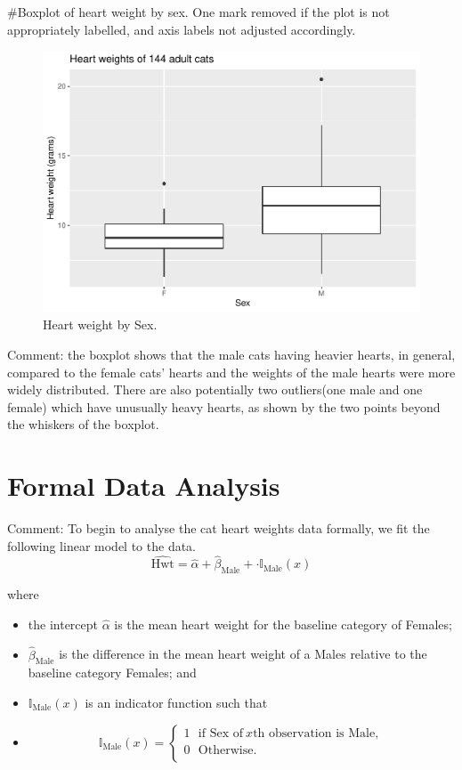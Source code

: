 \documentclass[
]{article}
\begin{document}
\#Boxplot of heart weight by sex. One mark removed if the plot is not
appropriately labelled, and axis labels not adjusted accordingly.

\begin{figure}[H]

{\centering \includegraphics[width=0.68\linewidth]{2561551_PracticeClassTest_files/figure-latex/boxplot-1} 

}

\caption{\label{fig:box} Heart weight by Sex.}\label{fig:boxplot}
\end{figure}

Comment: the boxplot shows that the male cats having heavier hearts, in
general, compared to the female cats' hearts and the weights of the male
hearts were more widely distributed. There are also potentially two
outliers(one male and one female) which have unusually heavy hearts, as
shown by the two points beyond the whiskers of the boxplot.

\hypertarget{sec:FDA}{%
\section{Formal Data Analysis}\label{sec:FDA}}

Comment: To begin to analyse the cat heart weights data formally, we fit
the following linear model to the data.
\[\widehat{\mbox{Hwt}}=\widehat{\alpha}+\widehat{\beta}_{\mbox{Male}}+
\cdot \mathbb{I}_{\mbox{Male}}(x)\]

where

\begin{itemize}
\item
  the intercept \(\widehat{\alpha}\) is the mean heart weight for the
  baseline category of Females;
\item
  \(\widehat{\beta}_{\mbox{Male}}\) is the difference in the mean heart
  weight of a Males relative to the baseline category Females; and
\item
  \(\mathbb{I}_{\mbox{Male}}(x)\) is an indicator function such that
\item
  \[\mathbb{I}_{\mbox{Male}}(x)=\left\{
  \begin{array}{ll}
  1 ~~~ \mbox{if Sex of} ~ x \mbox{th observation is Male},\\
  0 ~~~ \mbox{Otherwise}.\\
  \end{array}
  \right.\]
\end{itemize}
\end{document}
